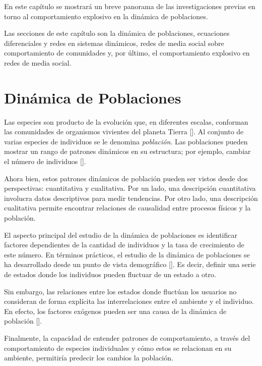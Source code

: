 \documentclass[../main.tex]{subfiles}
\begin{document}
\onehalfspacing

En este capítulo se mostrará un breve panorama de las investigaciones previas en torno al comportamiento explosivo en la dinámica de poblaciones. 

Las secciones de este capítulo son la dinámica de poblaciones, ecuaciones diferenciales y redes en sistemas dinámicos, redes de media social sobre comportamiento de comunidades y, por último,  el comportamiento explosivo en redes de media social.

\section{Dinámica de Poblaciones}


Las especies son producto de la evolución que, en diferentes escalas, conforman las comunidades de organismos vivientes del planeta Tierra [\cite{begon2009population}]. Al conjunto de varias especies de individuos se le denomina \textit{población}. Las poblaciones pueden mostrar un rango de patrones dinámicos en su estructura; por ejemplo, cambiar el número de individuos [\cite{Dimitrova2000, MT_MAY}]. 

Ahora bien, estos patrones dinámicos de población pueden ser vistos desde dos perspectivas: cuantitativa y cualitativa. Por un lado, una descripción cuantitativa involucra datos descriptivos para medir tendencias. Por otro lado, una descripción cualitativa permite encontrar relaciones de causalidad entre procesos físicos y la población. 


El aspecto principal del estudio de la dinámica de poblaciones es identificar factores dependientes de la cantidad de individuos y la tasa de crecimiento de este número. En términos prácticos, el estudio de la dinámica de poblaciones se ha desarrollado desde un punto de vista demográfico [\cite{PopulationDynamixsStevenAJuliano}]. Es decir, definir una serie de estados donde los individuos pueden fluctuar de un estado a otro.  

Sin embargo, las relaciones entre los estados donde fluctúan los usuarios no consideran de forma explícita las interrelaciones entre el ambiente y el individuo. En efecto, los factores exógenos pueden ser una causa de la dinámica  de población [\cite{GINN2007325}]. 


Finalmente, la capacidad de entender patrones de comportamiento, a través del comportamiento de especies individuales y cómo estos se relacionan en su ambiente, permitiría predecir los cambios la población. 
\end{document}
